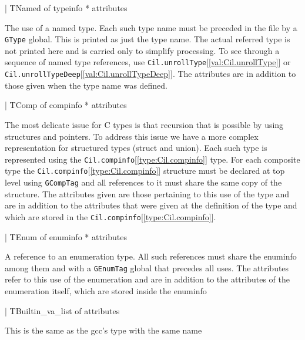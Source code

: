 \documentclass[11pt]{article}
\begin{document}
\begin{ocamldoccode}
  | TNamed of typeinfo * attributes
\end{ocamldoccode}
\begin{ocamldoccomment}
The use of a named type. Each such type name must be preceded 
 in the file by a {\tt{GType}} global. This is printed as just the 
 type name. The actual referred type is not printed here and is 
 carried only to simplify processing. To see through a sequence 
 of named type references, use {\tt{Cil.unrollType}}[\ref{val:Cil.unrollType}] or 
 {\tt{Cil.unrollTypeDeep}}[\ref{val:Cil.unrollTypeDeep}]. The attributes are in addition to those 
 given when the type name was defined.
\end{ocamldoccomment}
\begin{ocamldoccode}
  | TComp of compinfo * attributes
\end{ocamldoccode}
\begin{ocamldoccomment}
The most delicate issue for C types is that recursion that is possible by 
 using structures and pointers. To address this issue we have a more 
 complex representation for structured types (struct and union). Each such 
 type is represented using the {\tt{Cil.compinfo}}[\ref{type:Cil.compinfo}] type. For each composite 
 type the {\tt{Cil.compinfo}}[\ref{type:Cil.compinfo}] structure must be declared at top level using 
 {\tt{GCompTag}} and all references to it must share the same copy of the 
 structure. The attributes given are those pertaining to this use of the 
 type and are in addition to the attributes that were given at the 
 definition of the type and which are stored in the {\tt{Cil.compinfo}}[\ref{type:Cil.compinfo}].
\end{ocamldoccomment}
\begin{ocamldoccode}
  | TEnum of enuminfo * attributes
\end{ocamldoccode}
\begin{ocamldoccomment}
A reference to an enumeration type. All such references must
               share the enuminfo among them and with a {\tt{GEnumTag}} global that 
               precedes all uses. The attributes refer to this use of the 
               enumeration and are in addition to the attributes of the 
               enumeration itself, which are stored inside the enuminfo
\end{ocamldoccomment}
\begin{ocamldoccode}
  | TBuiltin_va_list of attributes
\end{ocamldoccode}
\begin{ocamldoccomment}
This is the same as the gcc's type with the same name
\end{ocamldoccomment}
\end{document}
